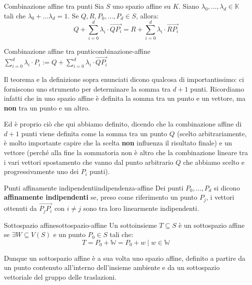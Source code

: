 \documentclass[12pt]{report}
\newcommand{\K}{\mathbb{K}}
\newcommand{\W}{\mathbb{W}}
\begin{document}
	\begin{teorema}{Combinazione affine tra punti}
		Sia $S$ uno spazio affine su $K$. Siano $\lambda_0, \dots, \lambda_d \in \K$ tali che $\lambda_0 + \dots \lambda_d = 1$.
		Se $Q, R, P_0, \dots, P_d \in S$, allora:
		\[
			Q + \sum_{i=0}^{d} \lambda_i \cdot \overrightarrow{QP_i} = R + \sum_{i=0}^{d} \lambda_i \cdot \overrightarrow{RP_i}
		\] 
	\end{teorema}
	
	\begin{definizione}{Combinazione affine tra punti}{combinazione-affine}
		$\sum_{i=0}^{d} \lambda_i \cdot P_i := Q + \sum_{i=0}^{d} \lambda_i \cdot \overrightarrow{QP_i}$
	\end{definizione}
	
	Il teorema e la definizione sopra enunciati dicono qualcosa di importantissimo: ci forniscono uno strumento per determinare la somma tra $d+1$ punti. Ricordiamo infatti che in uno spazio affine è definita la somma tra un punto e un vettore, ma \textbf{non} tra un punto e un altro.
	
	Ed è proprio ciò che qui abbiamo definito, dicendo che la combinazione affine di $d+1$ punti viene definita come la somma tra un punto $Q$ (scelto arbitrariamente, è molto importante capire che la scelta \textbf{non} influenza il risultato finale) e un vettore (perché alla fine la sommatoria non è altro che la combinazione lineare tra i vari vettori spostamento che vanno dal punto arbitrario $Q$ che abbiamo scelto e progressivamente uno dei $P_i$ punti).
	
	\begin{definizione}{Punti affinamente indipendenti}{indipendenza-affine}
		Dei punti $P_0, \dots, P_d$ si dicono \textbf{affinamente indipendenti} se, preso come riferimento un punto $P_j$, i vettori ottenuti da $\overrightarrow{P_jP_i}$ con $i \neq j$ sono tra loro linearmente indipendenti.
	\end{definizione}
	
	\begin{definizione}{Sottospazio affine}{sottospazio-affine}
		Un sottoinsieme $T \subseteq S$ è un sottospazio affine se $\exists W \subseteq V(S)$ e un punto $P_0 \in S$ tali che:
		\[
			T = P_0 + \W = {P_0 + w \mid w \in \W}
		\]
	\end{definizione}
	Dunque un sottospazio affine è a sua volta uno spazio affine, definito a partire da un punto contenuto all'interno dell'insieme ambiente e da un sottospazio vettoriale del gruppo delle traslazioni.
	
\end{document}
